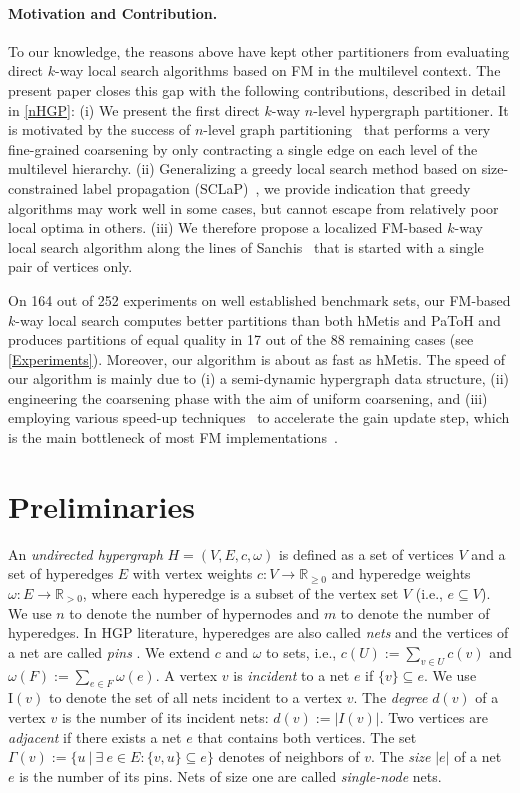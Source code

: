 \documentclass[runningheads,a4paper]{llncs}
\begin{document}
\paragraph{Motivation and Contribution.}
To our knowledge, the reasons above have kept other partitioners from evaluating direct $k$-way local search
algorithms based on FM in the multilevel context. The present paper closes this gap with the following 
contributions, described in detail in \autoref{nHGP}:
(i) We present the first direct $k$-way $n$-level hypergraph partitioner. It is motivated by the success of $n$-level graph 
partitioning~\cite{nGP} that performs a very fine-grained coarsening by only contracting a single edge on each level of the multilevel hierarchy. 
(ii) Generalizing a greedy local search method based on size-constrained label propagation (SCLaP)~\cite{LPAgraphPartitioning}, we provide indication that greedy algorithms may work well in some cases, but cannot escape from relatively poor local optima in others.
(iii) We therefore propose a localized FM-based $k$-way local search algorithm along the lines of Sanchis~\cite{HypergraphKFM}
that is started with a single pair of vertices only.

On 164 out of 252 experiments on  well established benchmark sets, our FM-based $k$-way local search computes better partitions than both hMetis and PaToH and produces
 partitions of equal quality in 17 out of the 88 remaining cases (see \autoref{Experiments}).
Moreover, our algorithm is about as fast as hMetis. The  speed of our algorithm is mainly due to (i)
a semi-dynamic hypergraph data structure, (ii) engineering the coarsening phase with the aim of
uniform coarsening, and (iii)
employing various speed-up techniques~\cite{Caldwell,FM82,LockedNets} to accelerate
the gain update step, which is the main bottleneck of most FM implementations~\cite{Papa2007}. 

\vfill
\section{Preliminaries} \label{Preliminaries}
An \textit{undirected hypergraph} $H=(V,E,c,\omega)$ is defined as a set of vertices $V$ and a
set of hyperedges $E$ with vertex weights $c:V \rightarrow \mathbb{R}_{\geq0}$ and hyperedge 
weights $\omega:E \rightarrow \mathbb{R}_{>0}$, where each hyperedge is a subset of the vertex set $V$ (i.e., $e \subseteq V$).
We use $n$ to denote the number of hypernodes and $m$ to denote the number of hyperedges. In
HGP literature, hyperedges are also called \emph{nets} and the vertices of a net are called \emph{pins} \cite{PaToH}.
We extend $c$ and $\omega$ to sets, i.e., $c(U) :=\sum_{v\in U} c(v)$ and $\omega(F) :=\sum_{e \in F} \omega(e)$.
A vertex $v$ is \textit{incident} to a net $e$ if $ \{v\} \subseteq e$. We use $\mathrm{I}(v)$ to denote the set of all nets incident to a vertex $v$. 
The \textit{degree} $d(v)$ of a vertex $v$ is the number of its incident nets: $d(v) := |I(v)|$.
Two vertices are \textit{adjacent} if there exists a net $e$ that contains both vertices. The set $\Gamma(v) := \{ u~|~\exists~e \in E : \{v,u\} \subseteq e\}$ denotes of neighbors of $v$.
The \textit{size} $|e|$ of a net $e$ is the number of its pins. Nets of size one are called \emph{single-node} nets.
\end{document}
